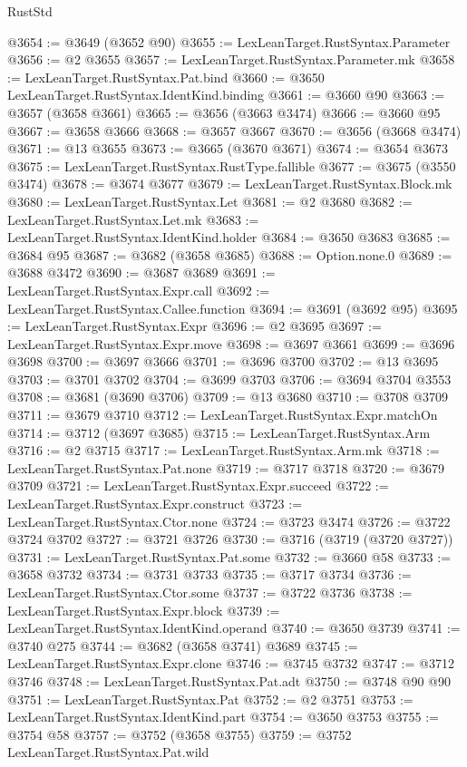 \begin{lexlean}{RustStd}
\begin{coremodule}
@3654 := @3649 (@3652 @90)
@3655 := LexLeanTarget.RustSyntax.Parameter
@3656 := @2 @3655
@3657 := LexLeanTarget.RustSyntax.Parameter.mk
@3658 := LexLeanTarget.RustSyntax.Pat.bind
@3660 := @3650 LexLeanTarget.RustSyntax.IdentKind.binding
@3661 := @3660 @90
@3663 := @3657 (@3658 @3661)
@3665 := @3656 (@3663 @3474)
@3666 := @3660 @95
@3667 := @3658 @3666
@3668 := @3657 @3667
@3670 := @3656 (@3668 @3474)
@3671 := @13 @3655
@3673 := @3665 (@3670 @3671)
@3674 := @3654 @3673
@3675 := LexLeanTarget.RustSyntax.RustType.fallible
@3677 := @3675 (@3550 @3474)
@3678 := @3674 @3677
@3679 := LexLeanTarget.RustSyntax.Block.mk
@3680 := LexLeanTarget.RustSyntax.Let
@3681 := @2 @3680
@3682 := LexLeanTarget.RustSyntax.Let.mk
@3683 := LexLeanTarget.RustSyntax.IdentKind.holder
@3684 := @3650 @3683
@3685 := @3684 @95
@3687 := @3682 (@3658 @3685)
@3688 := Option.none.{0}
@3689 := @3688 @3472
@3690 := @3687 @3689
@3691 := LexLeanTarget.RustSyntax.Expr.call
@3692 := LexLeanTarget.RustSyntax.Callee.function
@3694 := @3691 (@3692 @95)
@3695 := LexLeanTarget.RustSyntax.Expr
@3696 := @2 @3695
@3697 := LexLeanTarget.RustSyntax.Expr.move
@3698 := @3697 @3661
@3699 := @3696 @3698
@3700 := @3697 @3666
@3701 := @3696 @3700
@3702 := @13 @3695
@3703 := @3701 @3702
@3704 := @3699 @3703
@3706 := @3694 @3704 @3553
@3708 := @3681 (@3690 @3706)
@3709 := @13 @3680
@3710 := @3708 @3709
@3711 := @3679 @3710
@3712 := LexLeanTarget.RustSyntax.Expr.matchOn
@3714 := @3712 (@3697 @3685)
@3715 := LexLeanTarget.RustSyntax.Arm
@3716 := @2 @3715
@3717 := LexLeanTarget.RustSyntax.Arm.mk
@3718 := LexLeanTarget.RustSyntax.Pat.none
@3719 := @3717 @3718
@3720 := @3679 @3709
@3721 := LexLeanTarget.RustSyntax.Expr.succeed
@3722 := LexLeanTarget.RustSyntax.Expr.construct
@3723 := LexLeanTarget.RustSyntax.Ctor.none
@3724 := @3723 @3474
@3726 := @3722 @3724 @3702
@3727 := @3721 @3726
@3730 := @3716 (@3719 (@3720 @3727))
@3731 := LexLeanTarget.RustSyntax.Pat.some
@3732 := @3660 @58
@3733 := @3658 @3732
@3734 := @3731 @3733
@3735 := @3717 @3734
@3736 := LexLeanTarget.RustSyntax.Ctor.some
@3737 := @3722 @3736
@3738 := LexLeanTarget.RustSyntax.Expr.block
@3739 := LexLeanTarget.RustSyntax.IdentKind.operand
@3740 := @3650 @3739
@3741 := @3740 @275
@3744 := @3682 (@3658 @3741) @3689
@3745 := LexLeanTarget.RustSyntax.Expr.clone
@3746 := @3745 @3732
@3747 := @3712 @3746
@3748 := LexLeanTarget.RustSyntax.Pat.adt
@3750 := @3748 @90 @90
@3751 := LexLeanTarget.RustSyntax.Pat
@3752 := @2 @3751
@3753 := LexLeanTarget.RustSyntax.IdentKind.part
@3754 := @3650 @3753
@3755 := @3754 @58
@3757 := @3752 (@3658 @3755)
@3759 := @3752 LexLeanTarget.RustSyntax.Pat.wild

\end{coremodule}
\end{lexlean}

